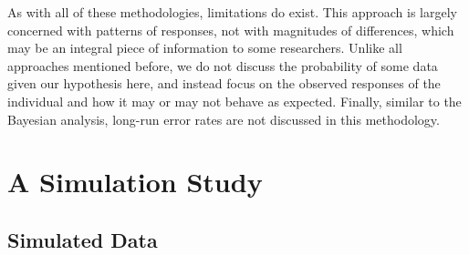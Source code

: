 \documentclass[english,mask,man]{apa6}
\theoremstyle{definition}
\theoremstyle{definition}
\theoremstyle{definition}
\theoremstyle{remark}
\begin{document}
As with all of these methodologies, limitations do exist. This approach
is largely concerned with patterns of responses, not with magnitudes of
differences, which may be an integral piece of information to some
researchers. Unlike all approaches mentioned before, we do not discuss
the probability of some data given our hypothesis here, and instead
focus on the observed responses of the individual and how it may or may
not behave as expected. Finally, similar to the Bayesian analysis,
long-run error rates are not discussed in this methodology.

\section{A Simulation Study}\label{a-simulation-study}

\subsection{Simulated Data}\label{simulated-data}
\end{document}

